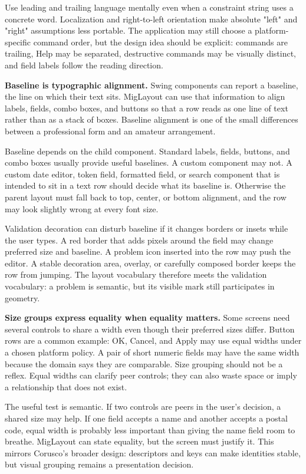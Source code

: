 Use leading and trailing language mentally even when a constraint string uses a
concrete word. Localization and right-to-left orientation make absolute
"left" and "right" assumptions less portable. The application may still choose
a platform-specific command order, but the design idea should be explicit:
commands are trailing, Help may be separated, destructive commands may be
visually distinct, and field labels follow the reading direction.

\textbf{Baseline is typographic alignment.} Swing components can report a
baseline, the line on which their text sits. MigLayout can use that information
to align labels, fields, combo boxes, and buttons so that a row reads as one
line of text rather than as a stack of boxes. Baseline alignment is one of the
small differences between a professional form and an amateur arrangement.

Baseline depends on the child component. Standard labels, fields, buttons, and
combo boxes usually provide useful baselines. A custom component may not. A
custom date editor, token field, formatted field, or search component that is
intended to sit in a text row should decide what its baseline is. Otherwise the
parent layout must fall back to top, center, or bottom alignment, and the row
may look slightly wrong at every font size.

Validation decoration can disturb baseline if it changes borders or insets
while the user types. A red border that adds pixels around the field may change
preferred size and baseline. A problem icon inserted into the row may push the
editor. A stable decoration area, overlay, or carefully composed border keeps
the row from jumping. The layout vocabulary therefore meets the validation
vocabulary: a problem is semantic, but its visible mark still participates in
geometry.

\textbf{Size groups express equality when equality matters.} Some screens need
several controls to share a width even though their preferred sizes differ.
Button rows are a common example: OK, Cancel, and Apply may use equal widths
under a chosen platform policy. A pair of short numeric fields may have the
same width because the domain says they are comparable. Size grouping should
not be a reflex. Equal widths can clarify peer controls; they can also waste
space or imply a relationship that does not exist.

The useful test is semantic. If two controls are peers in the user's decision,
a shared size may help. If one field accepts a name and another accepts a
postal code, equal width is probably less important than giving the name field
room to breathe. MigLayout can state equality, but the screen must justify it.
This mirrors Corusco's broader design: descriptors and keys can make identities
stable, but visual grouping remains a presentation decision.

